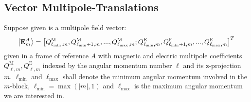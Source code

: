 \subsection{Vector Multipole-Translations}
Suppose given is a multipole field vector:
\begin{equation}
\ket{\mathbf{E}_m^A} = \left[
Q^\text{M}_{\ell_\text{min},m}, Q^\text{M}_{\ell_\text{min}+1,m},...,
Q^\text{M}_{\ell_\text{max},m};
Q^\text{E}_{\ell_\text{min},m}, Q^\text{E}_{\ell_\text{min}+1,m},...,
Q^\text{E}_{\ell_\text{max},m}
\right]^T
\end{equation}
given in a frame of reference $A$ with magnetic and electric multipole coefficients $Q^\text{M}_{\ell,m}, Q^\text{E}_{\ell,m}$ indexed by the angular momentum number $\ell$ and its z-projection $m$. $\ell_\text{min}$ and $\ell_\text{max}$ shall denote the minimum angular momentum involved in the $m$-block, $\ell_\text{min}=\max(|m|,1)$ and $\ell_\text{max}$ is the maximum angular momentum we are interested in.

